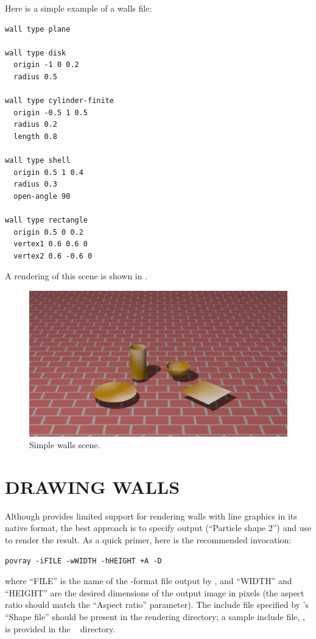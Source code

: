 Here is a simple example of a walls file:

\begin{verbatim}
wall type plane

wall type disk
  origin -1 0 0.2
  radius 0.5

wall type cylinder-finite
  origin -0.5 1 0.5
  radius 0.2
  length 0.8

wall type shell
  origin 0.5 1 0.4
  radius 0.3
  open-angle 90

wall type rectangle
  origin 0.5 0 0.2
  vertex1 0.6 0.6 0
  vertex2 0.6 -0.6 0
\end{verbatim}

\noindent
A rendering of this scene is shown in .

\begin{figure}
  \centering
  \includegraphics[width=\textwidth]{wallsdemo.ps}
  \caption{Simple walls scene.}
  \label{f:demo}
\end{figure}

\section{DRAWING WALLS}

Although  provides limited support for rendering walls
with line graphics in its native format, the best approach is to
specify  output (``Particle shape 2'') and use
 to render the result.  As a quick primer, here is the
recommended invocation:
\begin{verbatim}
povray -iFILE -wWIDTH -hHEIGHT +A -D
\end{verbatim}
where ``FILE'' is the name of the -format file output by
, and ``WIDTH'' and ``HEIGHT'' are the desired dimensions
of the output image in pixels (the aspect ratio should match the
 ``Aspect ratio'' parameter).  The  include
file specified by 's ``Shape file'' should be present in
the rendering directory; a sample include file, , is
provided in the \pkd\  directory.

